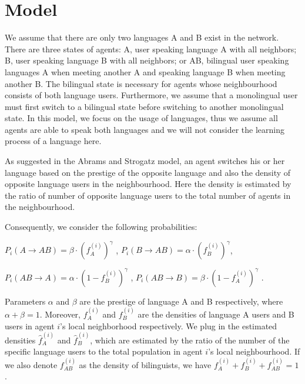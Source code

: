 \documentclass[a4paper, 11pt]{article}
\begin{document}
\section{Model}

We assume that there are only two languages A and B exist in the network\cite{castello2008modelling}. There are three states of agents: A, user speaking language A with all neighbors; B, user speaking language B with all neighbors; or AB, bilingual user speaking languages A when meeting another A and speaking language B when meeting another B. The bilingual state is necessary for agents whose neighbourhood consists of both language users. Furthermore, we assume that a monolingual user must first switch to a bilingual state before switching to another monolingual state. In this model, we focus on the usage of languages, thus we assume all agents are able to speak both languages and we will not consider the learning process of a language here. 

As suggested in the Abrams and Strogatz model\cite{abrams2003linguistics}, an agent switches his or her language based on the prestige of the opposite language and also the density of opposite language users in the neighbourhood. Here the density is estimated by the ratio of number of opposite language users to the total number of agents in the neighbourhood.

Consequently, we consider the following probabilities:
\begin{center}
$P_i (A \rightarrow AB)=\beta \cdotp (f_A^{(i)})^\gamma$ , $P_i (B \rightarrow AB)=\alpha \cdotp (f_B^{(i)})^\gamma$,
\end{center}
\begin{center}
$P_i (AB \rightarrow A)=\alpha \cdotp (1 - f_B^{(i)})^\gamma$ , $P_i (AB \rightarrow B)=\beta \cdotp (1 - f_A^{(i)})^\gamma$ .
\end{center}

Parameters $\alpha$ and $\beta$ are the prestige of language A and B respectively, where $\alpha + \beta = 1$. Moreover, $f_A^{(i)}$ and $f_B^{(i)}$ are the densities of language A users  and B users in agent $i$'s local neighborhood respectively.  We plug in the estimated densities $\hat{f}_A^{(i)}$ and $\hat{f}_B^{(i)}$, which are estimated by the ratio of the number of the specific language users to the total population in agent $i$'s local neighbourhood. If we also denote $f_{AB}^{(i)}$ as the density of bilinguists, we have $f_A^{(i)} + f_B^{(i)}+ f_{AB}^{(i)} = 1$. 
\end{document}
